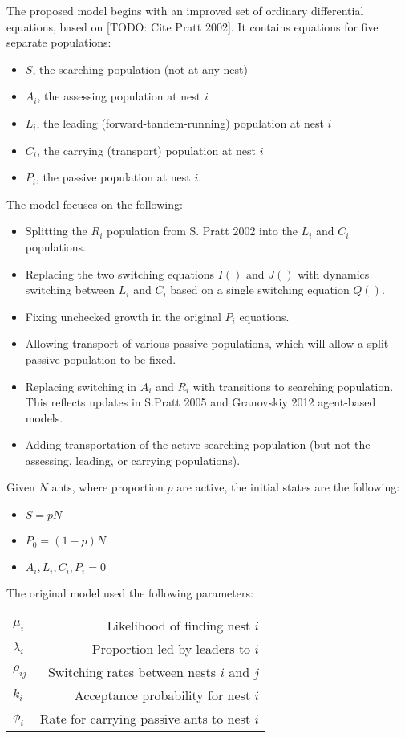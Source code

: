 \documentclass[letterpaper]{article}
\begin{document}
  The proposed model begins with an improved set of ordinary differential equations, based on [TODO: Cite Pratt 2002].
  It contains equations for five separate populations: 
  \begin{itemize}
      \item $S$, the searching population (not at any nest)
      \item $A_i$, the assessing population at nest $i$
      \item $L_i$, the leading (forward-tandem-running) population at nest $i$
      \item $C_i$, the carrying (transport) population at nest $i$
      \item $P_i$, the passive population at nest $i$. 
  \end{itemize}
  The model focuses on the following:
  \begin{itemize}
      \item Splitting the $R_i$ population from S. Pratt 2002 into the $L_i$ and $C_i$ populations.
      \item Replacing the two switching equations $I()$ and $J()$ with dynamics switching between $L_i$ and $C_i$ based on a single switching equation $Q()$.
      \item Fixing unchecked growth in the original $P_i$ equations.
      \item Allowing transport of various passive populations, which will allow a split passive population to be fixed.
      \item Replacing switching in $A_i$ and $R_i$ with transitions to searching population. This reflects updates in S.Pratt 2005 and Granovskiy 2012 agent-based models.
      \item Adding transportation of the active searching population (but not the assessing, leading, or carrying populations).
  \end{itemize}

  Given $N$ ants, where proportion $p$ are active, the initial states are the following:
  \begin{itemize}
      \item $S = pN$
      \item $P_0 = (1-p)N$ 
      \item $A_i, L_i, C_i, P_i = 0$ 
  \end{itemize}

  The original model used the following parameters:\\

\begin{tabular}{ l | r }
    \hline
  $\mu_i$     & Likelihood of finding nest $i$\\
  $\lambda_i$ & Proportion led by leaders to $i$\\
  $\rho_{ij}$ & Switching rates between nests $i$ and $j$\\
  $k_i$       & Acceptance probability for nest $i$\\
  $\phi_i$    & Rate for carrying passive ants to nest $i$\\
    \hline
\end{tabular} \\
\end{document}
